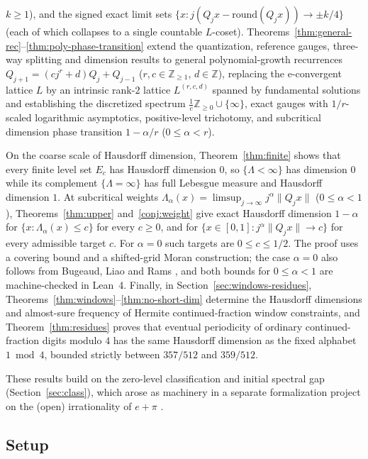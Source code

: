 \documentclass[11pt]{article}
\theoremstyle{definition}
\theoremstyle{remark}
\newcommand{\Z}{\mathbb{Z}}
\newcommand{\ee}{\mathrm{e}}
\newcommand{\Lam}{\Lambda}
\begin{document}
$k\ge1$), and the signed exact limit sets
$\{x:j(Q_jx-\mathrm{round}(Q_jx))\to\pm k/4\}$ (each of which collapses to a
single countable $L$-coset). Theorems~\ref{thm:general-rec}--\ref{thm:poly-phase-transition}
extend the quantization, reference gauges, three-way splitting and
dimension results to general polynomial-growth recurrences
$Q_{j+1}=(cj^r+d)Q_j+Q_{j-1}$ ($r,c\in\Z_{\ge1}$, $d\in\Z$), replacing the
$\ee$-convergent lattice $L$ by an intrinsic rank-$2$ lattice $L^{(r,c,d)}$
spanned by fundamental solutions and establishing the discretized spectrum
$\frac1c\Z_{\ge0}\cup\{\infty\}$, exact gauges with $1/r$-scaled logarithmic
asymptotics, positive-level trichotomy, and subcritical dimension phase
transition $1-\alpha/r$ ($0\le\alpha<r$).

On the coarse scale of Hausdorff dimension, Theorem~\ref{thm:finite} shows that
every finite level set $E_c$ has Hausdorff dimension $0$, so $\{\Lam<\infty\}$
has dimension $0$ while its complement $\{\Lam=\infty\}$ has full Lebesgue
measure and Hausdorff dimension $1$. At subcritical weights
$\Lam_\alpha(x)=\limsup_{j\to\infty}j^\alpha\|Q_jx\|$ ($0\le\alpha<1$),
Theorems~\ref{thm:upper} and~\ref{conj:weight} give exact Hausdorff dimension $1-\alpha$ for
$\{x:\Lam_\alpha(x)\le c\}$ for every $c\ge0$, and for
$\{x\in[0,1]:j^\alpha\|Q_jx\|\to c\}$ for every admissible target $c$.
For $\alpha=0$ such targets are $0\le c\le 1/2$.
The proof uses a covering bound and a shifted-grid Moran construction;
the case $\alpha=0$ also follows from Bugeaud, Liao and Rams \cite{BLR}, and
both bounds for $0\le\alpha<1$ are machine-checked in Lean~4. Finally, in
Section~\ref{sec:windows-residues}, Theorems~\ref{thm:windows}--\ref{thm:no-short-dim}
determine the Hausdorff dimensions and almost-sure frequency of Hermite
continued-fraction window constraints, and Theorem~\ref{thm:residues} proves
that eventual periodicity of ordinary continued-fraction digits modulo $4$ has
the same Hausdorff dimension as the fixed alphabet $1\bmod 4$, bounded strictly
between $357/512$ and $359/512$.

These results build on the zero-level classification and initial spectral gap
(Section~\ref{sec:class}), which arose as machinery in a separate formalization
project on the (open) irrationality of $e+\pi$ \cite{Phase1}.

\subsection{Setup}
\end{document}
